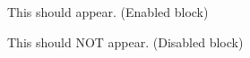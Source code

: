 \documentclass{article}
\begin{document}


\begin{whenTest}
This should appear. (Enabled block)
\end{whenTest}


\begin{whenTest}
This should NOT appear. (Disabled block)
\end{whenTest}


\end{document}

